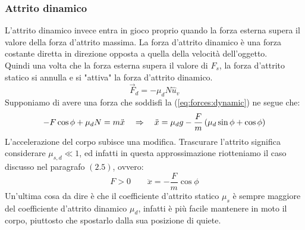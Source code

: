\subsubsection{Attrito dinamico}
L'attrito dinamico invece entra in gioco proprio quando la forza esterna
supera il valore della forza d'attrito massima. La forza d'attrito dinamico
è una forza costante diretta in direzione opposta a quella della velocità
dell'oggetto.\\
Quindi una volta che la forza esterna supera il valore di $F_s$,
la forza d'attrito statico si annulla e si "attiva" la forza d'attrito dinamico.
\begin{equation}
    \vec F_d = -\mu_dN\hat u_v
\label{eq:forces:dynamic}
\end{equation}
Supponiamo di avere una forza che soddisfi la (\ref{eq:forces:dynamic})
ne segue che:
\begin{equation}
    -F\cos\phi + \mu_dN = m\ddot x \quad\Rightarrow\quad \ddot x =
    \mu_dg-\frac Fm\left(\mu_d\sin\phi + \cos\phi\right)
\end{equation}
L'accelerazione del corpo subisce una modifica. Trascurare l'attrito
significa considerare $\mu_{s,d}\ll 1$, ed infatti in questa approssimazione
riotteniamo il caso discusso nel paragrafo $(2.5)$, ovvero:
\begin{equation}
    F>0\quad\quad \ddot x = -\frac Fm\cos\phi
\end{equation}
Un'ultima cosa da dire è che il coefficiente d'attrito statico $\mu_s$ è
sempre maggiore del coefficiente d'attrito dinamico $\mu_d$, infatti è più
facile mantenere in moto il corpo, piuttosto che spostarlo dalla sua
posizione di quiete.

